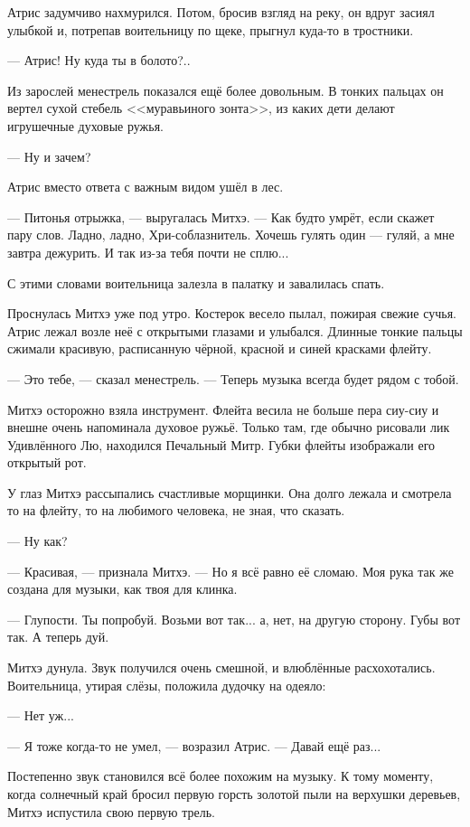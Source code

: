 Атрис задумчиво нахмурился.
Потом, бросив взгляд на реку, он вдруг засиял улыбкой и, потрепав воительницу по щеке, прыгнул куда-то в тростники.

--- Атрис!
Ну куда ты в болото?..

Из зарослей менестрель показался ещё более довольным.
В тонких пальцах он вертел сухой стебель <<муравьиного зонта>>, из каких дети делают игрушечные духовые ружья.

--- Ну и зачем?

Атрис вместо ответа с важным видом ушёл в лес.

--- Питонья отрыжка, --- выругалась Митхэ.
--- Как будто умрёт, если скажет пару слов.
Ладно, ладно, Хри-соблазнитель.
Хочешь гулять один --- гуляй, а мне завтра дежурить.
И так из-за тебя почти не сплю...

С этими словами воительница залезла в палатку и завалилась спать.

Проснулась Митхэ уже под утро.
Костерок весело пылал, пожирая свежие сучья.
Атрис лежал возле неё с открытыми глазами и улыбался.
Длинные тонкие пальцы сжимали красивую, расписанную чёрной, красной и синей красками флейту.

--- Это тебе, --- сказал менестрель.
--- Теперь музыка всегда будет рядом с тобой.

Митхэ осторожно взяла инструмент.
Флейта весила не больше пера сиу-сиу и внешне очень напоминала духовое ружьё.
Только там, где обычно рисовали лик Удивлённого Лю, находился Печальный Митр.
Губки флейты изображали его открытый рот.

У глаз Митхэ рассыпались счастливые морщинки.
Она долго лежала и смотрела то на флейту, то на любимого человека, не зная, что сказать.

--- Ну как?

--- Красивая, --- признала Митхэ.
--- Но я всё равно её сломаю.
Моя рука так же создана для музыки, как твоя для клинка.

--- Глупости.
Ты попробуй.
Возьми вот так... а, нет, на другую сторону.
Губы вот так.
А теперь дуй.

Митхэ дунула.
Звук получился очень смешной, и влюблённые расхохотались.
Воительница, утирая слёзы, положила дудочку на одеяло:

--- Нет уж...

--- Я тоже когда-то не умел, --- возразил Атрис.
--- Давай ещё раз...

Постепенно звук становился всё более похожим на музыку.
К тому моменту, когда солнечный край бросил первую горсть золотой пыли на верхушки деревьев, Митхэ испустила свою первую трель.

